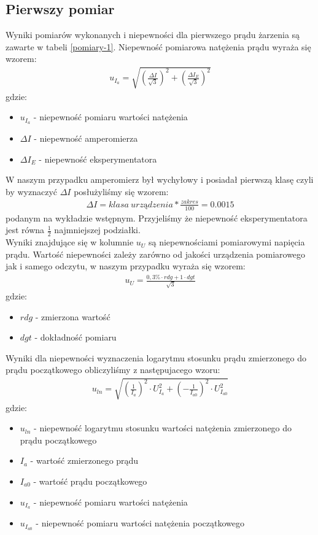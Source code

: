 \documentclass[a4paper]{article}
\newlength{\du}
\begin{document}
\subsection{Pierwszy pomiar}
Wyniki pomiarów wykonanych i niepewności dla pierwszego prądu żarzenia są zawarte w tabeli \ref{pomiary-1}. Niepewność pomiarowa natężenia prądu wyraża się wzorem: 
\begin{align*}
u_{I_{a}} = \sqrt{(\frac{\Delta I}{\sqrt{3}})^2 + (\frac{\Delta I_{E}}{\sqrt{3}})^2}
\end{align*}
gdzie:
\begin{itemize}
\item $u_{I_{a}}$ - niepewność pomiaru wartości natężenia \\
\item $\Delta I$ - niepewność amperomierza \\
\item $\Delta I_{E}$ - niepewność eksperymentatora\\
\end{itemize}

W naszym przypadku amperomierz był wychyłowy i posiadał pierwszą klasę czyli by wyznaczyć $\Delta I$ posłużyliśmy się wzorem:
\begin{align*}
\Delta I = klasa\ urządzenia * \frac{zakres}{100} = 0.0015
\end{align*}
podanym na wykładzie wstępnym.
Przyjeliśmy że niepewność eksperymentatora jest równa $\frac{1}{2}$ najmniejszej podziałki.\\

Wyniki znajdujące się w kolumnie $u_{U}$ są niepewnościami pomiarowymi napięcia prądu. Wartość niepewności zależy zarówno od jakości urządzenia pomiarowego jak i samego odczytu, w naszym przypadku wyraża się wzorem:
\begin{align*}
u_{U} = \frac{0,3 \% \cdot rdg + 1 \cdot dgt}{\sqrt{3}}
\end{align*}
gdzie:
 \begin{itemize}
\item $rdg$ - zmierzona wartość 
\item $dgt$ - dokładność pomiaru 
\end{itemize}

Wyniki dla niepewności wyznaczenia logarytmu stosunku prądu zmierzonego do prądu początkowego obliczyliśmy z następujacego wzoru:
\begin{align*}
u_{ln} = \sqrt{(\frac{1}{I_{a}})^2 \cdot U_{I_{a}}^2 + (- \frac{1}{I_{a0}})^2 \cdot U_{I_{a0}}^2 }
\end{align*}
gdzie:
\begin{itemize}
\item $u_{ln}$ - niepewność logarytmu stosunku wartości natężenia zmierzonego do prądu początkowego
\item $I_{a}$ - wartość zmierzonego prądu
\item $I_{a0}$ - wartość prądu początkowego
\item $u_{I_{a}}$ - niepewność pomiaru wartości natężenia
\item $u_{I_{a0}}$ - niepewność pomiaru wartości natężenia początkowego 
\end{itemize}
\end{document}
